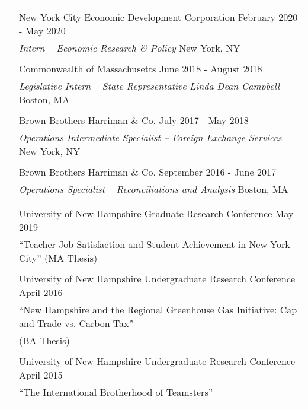 \documentclass[letterpaper, 11pt]{article}
\begin{document}
\begin{longtable}{p{0.1in}p{5.9in}}
\pagebreak 

\multicolumn{2}{l}{\color{Maroon}{INDUSTRY EXPERIENCE}}\\

& New York City Economic Development Corporation \hfill February 2020 - May 2020 \\
& {\sl Intern -- Economic Research \& Policy} \hfill New York, NY\\ & \\

& Commonwealth of Massachusetts \hfill June 2018 - August 2018 \\
& {\sl Legislative Intern -- State Representative Linda Dean Campbell} \hfill Boston, MA\\ & \\

& Brown Brothers Harriman \& Co. \hfill July 2017 - May 2018 \\
& {\sl Operations Intermediate Specialist – Foreign Exchange Services} \hfill New York, NY \\ & \\

& Brown Brothers Harriman \& Co. \hfill September 2016 - June 2017 \\
& {\sl Operations Specialist – Reconciliations and Analysis} \hfill Boston, MA \\ & \\


{\color{Maroon}{PRESENTATIONS}} \\

& University of New Hampshire Graduate Research Conference \hfill May 2019 \\
& \hspace{10pt} “Teacher Job Satisfaction and Student Achievement in New York City” (MA Thesis) \\ & \\

& University of New Hampshire Undergraduate Research Conference \hfill April 2016 \\
& \hspace{10pt} “New Hampshire and the Regional Greenhouse Gas Initiative: Cap and Trade vs. Carbon Tax” \\
& \hspace{10pt} (BA Thesis) \\ & \\

& University of New Hampshire Undergraduate Research Conference \hfill April 2015 \\
& \hspace{10pt} “The International Brotherhood of Teamsters” \\ & \\


\end{longtable}
\end{document}
